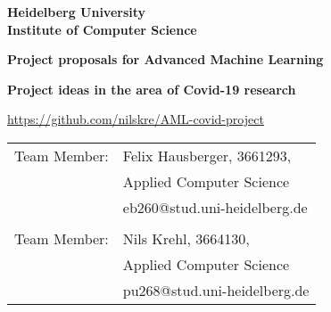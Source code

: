 \documentclass[
12pt,         %
a4paper,      %
BCOR10mm,     %
DIV14,        %
]{article}
\theoremstyle{defi}
\begin{document}
\begin{titlepage}

\vspace*{1cm}
\begin{center}
\textbf{ 
\Large Heidelberg University\\
\smallskip
\Large Institute of Computer Science\\
\smallskip
}

\vspace{3cm}

\textbf{\large Project proposals for Advanced Machine Learning}

\vspace{0.5\baselineskip}
{\huge
\textbf{Project ideas in the area of Covid-19 research}
}
\vspace{0.5cm}

\url{https://github.com/nilskre/AML-covid-project}

\end{center}

\vfill 

{\large
\begin{tabular}[l]{ll}
Team Member: & Felix Hausberger, 3661293,\\
  & Applied Computer Science\\
  & eb260@stud.uni-heidelberg.de\\
  & \\
Team Member: & Nils Krehl, 3664130,\\
  & Applied Computer Science\\
  & pu268@stud.uni-heidelberg.de\\
  
\end{tabular}
}

\end{titlepage}

%
%
%




%


%

%
%
%
%

\clearpage
{}
%


\newpage
\printbibliography
\end{document}
